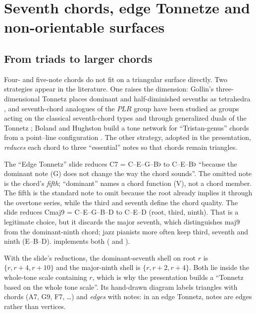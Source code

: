 \chapter{Seventh chords, edge Tonnetze and non-orientable surfaces}\label{ch:nonorient}

\section{From triads to larger chords}
Four- and five-note chords do not fit on a triangular surface directly. Two strategies appear in the literature.
One raises the dimension: Gollin's three-dimensional Tonnetz places dominant and half-diminished sevenths as
tetrahedra \citep{gollin1998}, and seventh-chord analogues of the $PLR$ group have been studied as groups acting on
the classical seventh-chord types \citep{cannas2017} and through generalized duals of the Tonnetz
\citep{cannas2018}; Boland and Hughston build a tone network for ``Tristan-genus'' chords from a point--line
configuration \citep{boland2025}. The other strategy, adopted in the presentation, \emph{reduces} each chord to
three ``essential'' notes so that chords remain triangles.

\begin{correctionbox}
The ``Edge Tonnetz'' slide reduces C7 = C--E--G--B$\flat$ to C--E--B$\flat$ ``because the dominant note (G) does not
change the way the chord sounds''. The omitted note is the chord's \emph{fifth}; ``dominant'' names a chord
function (V), not a chord member. The fifth is the standard note to omit because the root already implies it
through the overtone series, while the third and seventh define the chord quality. The slide reduces
Cmaj9 = C--E--G--B--D to C--E--D (root, third, ninth). That is a legitimate choice, but it discards the major
seventh, which distinguishes maj9 from the dominant-ninth chord; jazz pianists more often keep third, seventh and
ninth (E--B--D).  implements both ( and ).
\end{correctionbox}

With the slide's reductions, the dominant-seventh shell on root $r$ is $\{r,r+4,r+10\}$ and the major-ninth
shell is $\{r,r+2,r+4\}$. Both lie inside the whole-tone scale containing $r$, which is why the presentation
builds a ``Tonnetz based on the whole tone scale''. Its hand-drawn diagram labels triangles with chords (A7, G9,
F7, \dots) and \emph{edges} with notes: in an edge Tonnetz, notes are edges rather than vertices.

